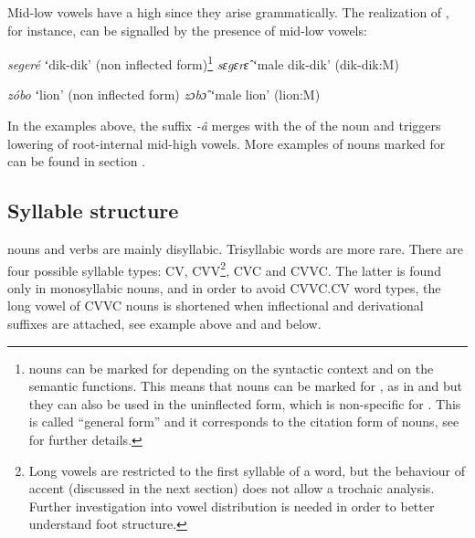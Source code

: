 \documentclass[output=paper,modfonts,nonflat,hidelinks]{langsci/langscibook}
\begin{document}
\largerpage
Mid-low vowels have a high  since they arise grammatically. The realization of  , for instance, can be signalled by the presence of mid-low vowels:

 \begin{exe}
 	\ex \begin{xlist}
 	\ex \textit{segeré}\hspace{7mm} ʻdik-dik' (non inflected form)\footnote{ nouns can be marked for  depending on the syntactic context and on the semantic functions. This means that nouns can be marked for , as in  and  but they can also be used in the uninflected form, which is non-specific for . This is called “general form” and it corresponds to the citation form of nouns, see \citet{Petrollino2016} for further details.}
    \ex \textit{sɛgɛrɛ̂}\hspace{7mm} ʻmale dik-dik' \label{ex:Petrollino:dikdik} (dik-dik:M)
 	\end{xlist}
 \end{exe}
 
\begin{exe}
 	\ex \begin{xlist}
 	\ex \textit{zóbo}\hspace{10mm} ʻlion' (non inflected form)
    \ex \textit{zɔbɔ̂}\hspace{10mm} ʻmale lion' \label{ex:Petrollino:lion} (lion:M)
 	\end{xlist}
 \end{exe}
In the examples above, the  suffix \textit{-â} merges with the  of the noun and triggers lowering of root-internal mid-high vowels. More examples of nouns marked for   can be found in section .

\subsection{Syllable structure} \label{sec:Petrollino:Syllablestructure}

 nouns and verbs are mainly disyllabic. Trisyllabic words are more rare. There are four possible syllable types: CV, CVV\footnote{Long vowels are restricted to the first syllable of a word, but the behaviour of accent (discussed in the next section) does not allow a trochaic analysis. Further investigation into vowel distribution is needed in order to better understand foot structure.}, CVC and CVVC. The latter is found only in monosyllabic nouns, and in order to avoid CVVC.CV word types, the long vowel of CVVC nouns is shortened when inflectional and derivational suffixes are attached, see example  above and  and  below.
\end{document}
